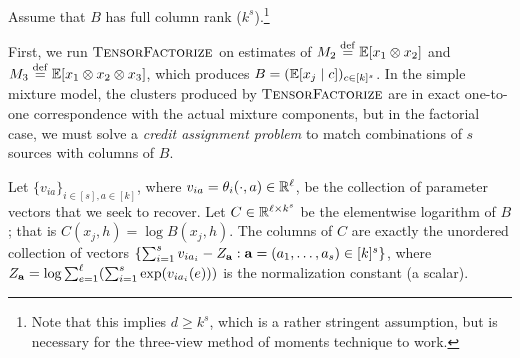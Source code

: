 \begin{assumption}
  Assume that $B$ has full column rank ($k^s$).\footnote{Note that this implies
  $d \ge k^s$, which is a rather stringent assumption, but is necessary for the
  three-view method of moments technique to work.}
\end{assumption}

First, we run $\text{\sc TensorFactorize}$ on estimates of
$M_2 \stackrel{\rm def}{=} \mathbb{E}[x_1 \otimes x_2]$ and $M_3 \stackrel{\rm def}{=} \mathbb{E}[x_1 \otimes x_2 \otimes x_3]$,
which produces $B = (\mathbb{E}[x_j \mid c])_{c \in [k]^s}$.
In the simple mixture model,
the clusters produced by $\text{\sc TensorFactorize}$ are in exact one-to-one correspondence
with the actual mixture components, but in the factorial case, we must solve
a \emph{credit assignment problem} to match combinations of $s$ sources
with columns of $B$.

Let $\{ v_{ia} \}_{i \in [s], a \in [k]}$, where $v_{ia} = \theta_i(\cdot, a) \in \mathbb{R}^\ell$,
be the collection of parameter vectors that we seek to recover.
Let $C \in \mathbb{R}^{\ell \times k^s}$ be the elementwise logarithm of $B$; that is
$C(x_j, h) = \log B(x_j, h)$.
The columns of $C$ are exactly the unordered collection of vectors
$\{ \sum_{i=1}^s v_{ia_i} - Z_{\mathbf{a}} : \mathbf{a} = (a_1, \dots, a_s) \in [k]^s \}$,
where $Z_{\mathbf{a}} = \log \sum_{e=1}^\ell (\sum_{i=1}^s \exp(v_{ia_i}(e)))$ is the normalization constant (a scalar).

